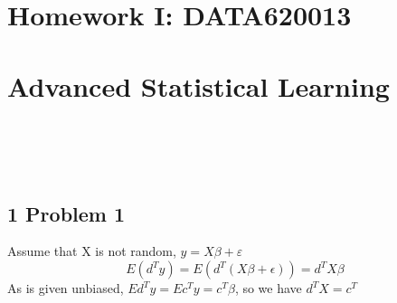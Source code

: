 \documentclass[10pt,a4paper]{article}
\begin{document}

{\centering\section*{Homework I: DATA620013}}
{\centering\section*{Advanced Statistical Learning}}
%
\begin{flushright}
	\Large {} \\
	\Large {} \\
	\Large {} \\
\end{flushright}


\subsection{1 Problem 1}
Assume that X is not random, $y=X\beta + \varepsilon$\\
$$ E(d^Ty)=E(d^T(X\beta+\epsilon))=d^TX\beta $$ 
As is given unbiased, $Ed^Ty=Ec^Ty=c^T\beta$, so we have $d^TX=c^T$
\end{document}
